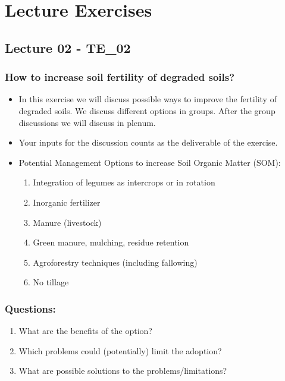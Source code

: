 \chapter{Lecture Exercises}
\setlength{\headheight}{22.94003pt}
\addtolength{\topmargin}{-10.22661pt}




\section{Lecture 02 - TE\_02}
\subsection*{How to increase soil fertility of degraded soils?}

\begin{itemize}
    \item In this exercise we will discuss possible ways to improve the fertility of degraded soils. We discuss different options in groups. After the group discussions we will discuss in plenum.
    \item Your inputs for the discussion counts as the deliverable of the exercise.
    \item Potential Management Options to increase Soil Organic Matter (SOM):
    \begin{enumerate}
        \item Integration of legumes as intercrops or in rotation
        \item Inorganic fertilizer
        \item Manure (livestock)
        \item Green manure, mulching, residue retention
        \item Agroforestry techniques (including fallowing)
        \item No tillage
    \end{enumerate}
\end{itemize}

\subsection*{Questions:}
\begin{enumerate}
    \item What are the benefits of the option?
    \item Which problems could (potentially) limit the adoption?
    \item What are possible solutions to the problems/limitations?
\end{enumerate}

